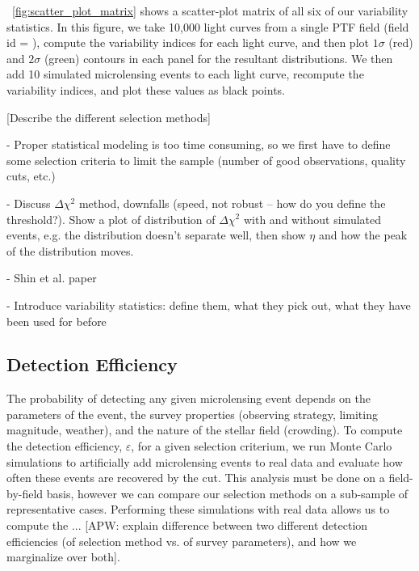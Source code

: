 \documentclass[12pt,preprint]{aastex}
\begin{document}
\figurename~\ref{fig:scatter_plot_matrix} shows a scatter-plot matrix of all six of our variability statistics. In this figure, we take 10,000 light curves from a single PTF field (field id = ), compute the variability indices for each light curve, and then plot $1\sigma$ (red) and $2\sigma$ (green) contours in each panel for the resultant distributions. We then add 10 simulated microlensing events to each light curve, recompute the variability indices, and plot these values as black points.

[Describe the different selection methods]

- Proper statistical modeling is too time consuming, so we first have to define some selection criteria to limit the sample (number of good observations, quality cuts, etc.)

- Discuss $\Delta \chi^2$ method, downfalls (speed, not robust -- how do you define the threshold?). Show a plot of distribution of $\Delta \chi^2$ with and without simulated events, e.g. the distribution doesn't separate well, then show $\eta$ and how the peak of the distribution moves.

- Shin et al. paper

- Introduce variability statistics: define them, what they pick out, what they have been used for before

\subsection{Detection Efficiency}
The probability of detecting any given microlensing event depends on the parameters of the event, the survey properties (observing strategy, limiting magnitude, weather), and the nature of the stellar field (crowding). To compute the detection efficiency, $\varepsilon$, for a given selection criterium, we run Monte Carlo simulations to artificially add microlensing events to real data and evaluate how often these events are recovered by the cut. This analysis must be done on a field-by-field basis, however we can compare our selection methods on a sub-sample of representative cases. Performing these simulations with real data allows us to compute the ... [APW: explain difference between two different detection efficiencies (of selection method vs. of survey parameters), and how we marginalize over both].
\end{document}
